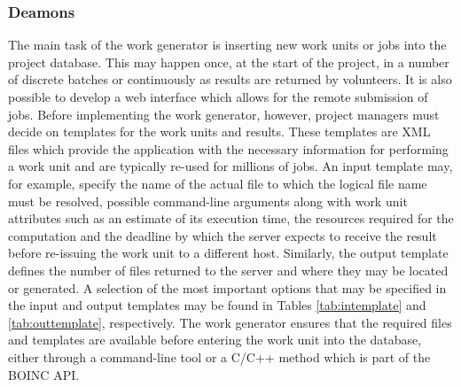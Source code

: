 \subsubsection{Deamons} \label{Bdeamons}
The main task of the work generator is inserting new work units or jobs into the project database. This may happen once, at the start of the project, in a number of discrete batches or continuously as results are returned by volunteers. It is also possible to develop a web interface which allows for the remote submission of jobs.
Before implementing the work generator, however, project managers must decide on templates for the work units and results. These templates are XML files which provide  the application with the necessary information for performing a work unit and are typically re-used for millions of jobs. 
An input template may, for example, specify the name of the actual file to which the logical file name must be resolved, possible command-line arguments along with work unit attributes such as an estimate of its execution time, the resources required for the computation and the deadline by which the server expects to receive the result before re-issuing the work unit to a different host.  
Similarly, the output template defines the number of files returned to the server and where they may be located  or generated. A selection of the most important options that may be specified in the input and output templates may be found in Tables \ref{tab:intemplate} and \ref{tab:outtemplate}, respectively. The work generator ensures that the required files and templates are available before entering the work unit into the database, either through a command-line tool or  a C/C++ method which is part of the BOINC API.

